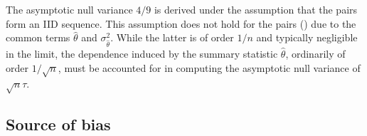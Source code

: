 \documentclass[12pt]{article}
\newcommand{\thetahat}{\hat{\theta}}
\begin{document}
    The asymptotic null variance $4/9$ is derived under the assumption
    that the pairs form an IID sequence. This assumption does not hold
    for the pairs () due to the common terms
    $\hat{\theta}$ and $\sigma^2_{\hat{\theta}}$. While the latter is
    of order $1/n$ and typically negligible in the limit, the
    dependence induced by the summary statistic $\thetahat$,
    ordinarily of order $1/\sqrt{n}$, must be accounted for in
    computing the asymptotic null variance of $\sqrt{n}\tau$.
    
    
  \subsection{Source of bias}\label{section:theory:source of bias}
  
\end{document}
